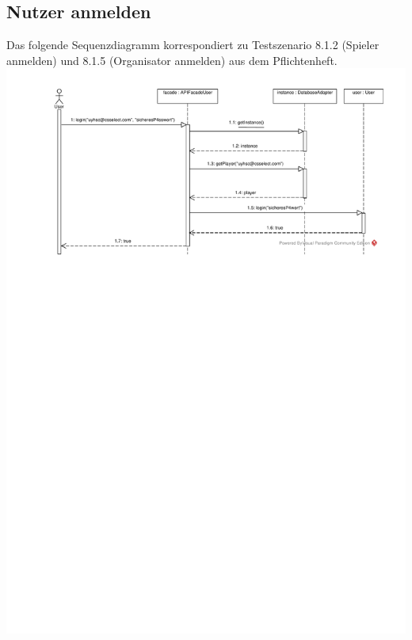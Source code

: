 \documentclass[a4paper]{scrreprt}
\begin{document}
	\subsection{Nutzer anmelden}
	Das folgende Sequenzdiagramm korrespondiert zu Testszenario 8.1.2 (Spieler anmelden) und 8.1.5 (Organisator anmelden) aus dem Pflichtenheft.\\
	\includegraphics[width=\textwidth]{img/Spieler_anmelden.pdf}
\end{document}
